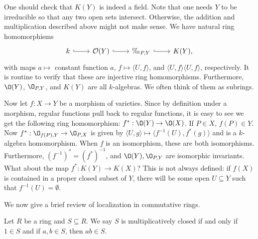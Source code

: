 One should check that $K(Y)$ is indeed a field. Note that one needs $Y$ to be irreducible so that any two open sets intersect. Otherwise, the addition and multiplication described above might not make sense. We have natural ring homomorphisms 
	\[
	\begin{tikzcd}
	k \arrow[hook]{r} & \mathcal{O}(Y) \arrow[hook]{r} & \O_{P,Y} \arrow[hook]{r} & K(Y),
	\end{tikzcd}
	\]
with maps $a \mapsto$ constant function $a$, $f \mapsto \langle U, f \rangle$, and $\langle U,f \rangle \langle U,f \rangle$, respectively. It is routine to verify that these are injective ring homomorphisms. Furthermore, $\O(Y)$, $\O_{P,Y}$, and $K(Y)$ are all $k$-algebras. We often think of them as subrings. 


Now let $f: X \to Y$ be a morphism of varieties. Since by definition under a morphism, regular functions pull back to regular functions, it is easy to see we get the following ring homomorphism: $f^*: \O(Y) \to \O(X)$. If $P \in X$, $f(P) \in Y$. Now $f^*: \O_{f(P),Y} \to \O_{P,X}$ is given by $\langle U, g \rangle \mapsto \langle f^{-1}(U), f^*(g) \rangle$ and is a $k$-algebra homomorphism. When $f$ is an isomorphism, these are both isomorphisms. Furthermore, $(f^{-1})^*= (f^*)^{-1}$, and $\O(Y), \O_{P,Y}$ are isomorphic invariants. What about the map $f^*: K(Y) \to K(X)$? This is not always defined: if $f(X)$ is contained in a proper closed subset of $Y$, there will be some open $U \subseteq Y$ such that $f^{-1}(U)= \emptyset$. 



We now give a brief review of localization in commutative rings.

\begin{dfn}
Let $R$ be a ring and $S \subseteq R$. We say $S$ is multiplicatively closed if and only if $1 \in S$ and if $a,b \in S$, then $ab \in S$. 
\end{dfn}


